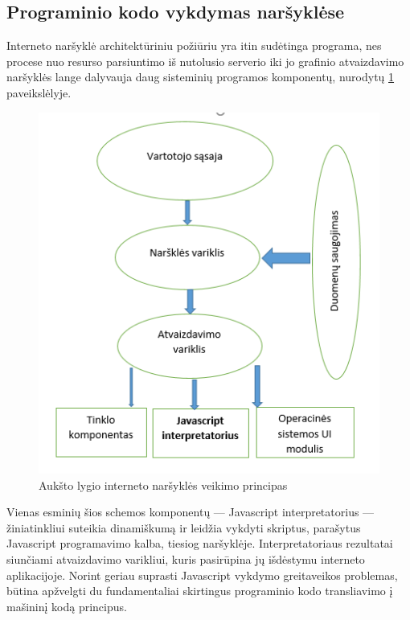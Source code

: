 \documentclass{VUMIFPSkursinis}
\begin{document}
\subsection{Programinio kodo vykdymas naršyklėse}
Interneto naršyklė architektūriniu požiūriu yra itin sudėtinga programa, nes procese nuo resurso parsiuntimo iš nutolusio serverio iki jo grafinio atvaizdavimo naršyklės lange dalyvauja daug sisteminių programos komponentų, nurodytų \ref{fig:browser_architecture} paveikslėlyje. 

\begin{figure}[h!]
  \begin{center}
  \includegraphics[scale=0.8]{naršyklės_architektūra.png}
  \end{center}
  \caption{Aukšto lygio interneto naršyklės veikimo principas}
  \label{fig:browser_architecture}
\end{figure}

Vienas esminių šios schemos komponentų — Javascript interpretatorius — žiniatinkliui suteikia dinamiškumą ir leidžia vykdyti skriptus, parašytus Javascript programavimo kalba, tiesiog naršyklėje. Interpretatoriaus rezultatai siunčiami atvaizdavimo varikliui, kuris pasirūpina jų išdėstymu interneto aplikacijoje. Norint geriau suprasti Javascript vykdymo greitaveikos problemas, būtina apžvelgti du fundamentaliai skirtingus programinio kodo transliavimo į mašininį kodą principus.
\end{document}
